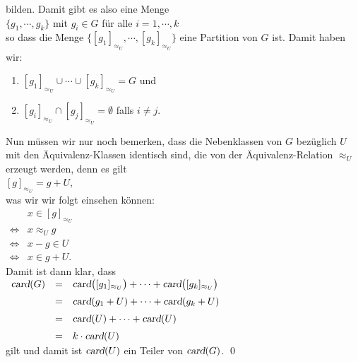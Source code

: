 bilden.  Damit gibt es also eine Menge
\\[0.2cm]
\hspace*{1.3cm}
$\{g_1,\cdots, g_k\}$ \quad mit $g_i \in G$ f\"{u}r alle $i=1,\cdots,k$
\\[0.2cm]
so dass die Menge $\bigl\{ [g_1]_{\approx_U}, \cdots, [g_k]_{\approx_U}\bigr\}$ eine Partition von
$G$ ist.  Damit haben wir:
\begin{enumerate}
\item $[g_1]_{\approx_U} \cup \cdots \cup [g_k]_{\approx_U} = G$ \quad und
\item $[g_i]_{\approx_U} \cap [g_j]_{\approx_U} = \emptyset$ \quad falls $i \not= j$.
\end{enumerate}
Nun m\"{u}ssen wir nur noch bemerken, dass die Nebenklassen von $G$ bez\"{u}glich $U$ mit den
\"{A}quivalenz-Klassen identisch sind, die von der \"{A}quivalenz-Relation $\approx_U$ erzeugt werden, denn
es gilt
\\[0.2cm]
\hspace*{1.3cm}
$[g]_{\approx_U} = g + U$,
\\[0.2cm] 
was wir wir folgt einsehen k\"{o}nnen:
\\[0.2cm]
\hspace*{1.3cm}
$
\begin{array}{cl}
                & x \in [g]_{\approx_U}  \\[0.2cm]
\Leftrightarrow & x \approx_U g        \\[0.2cm]
\Leftrightarrow & x - g \in U          \\[0.2cm] 
\Leftrightarrow & x \in g + U.
\end{array}
$
\\[0.2cm]
Damit ist dann klar, dass
\\[0.2cm]
\hspace*{1.3cm}
$
\begin{array}{lcl}
  \textsl{card}(G) & = & \textsl{card}\bigl([g_1]_{\approx_U}\bigr) + \cdots + \textsl{card}\bigl([g_k]_{\approx_U}\bigr) 
                         \\[0.2cm]
                   & = & \textsl{card}(g_1 + U) + \cdots + \textsl{card}(g_k + U) \\[0.2cm]
                   & = & \textsl{card}(U) + \cdots + \textsl{card}(U) \\[0.2cm]
                   & = & k \cdot \textsl{card}(U)
\end{array}
$
\\[0.2cm]
gilt und damit ist $\textsl{card}(U)$ ein Teiler von $\textsl{card}(G)$.  \qed

